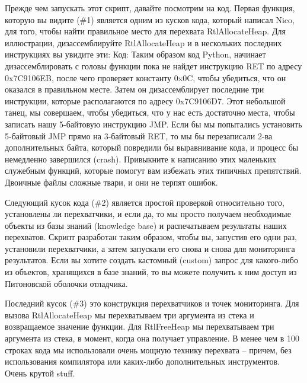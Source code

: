 \documentclass[12pt]{book}
\begin{document}



Прежде чем запускать этот скрипт, давайте посмотрим на код. Первая функция, которую вы видите (\#1) является одним из кусков кода, который написал Nico, для того, чтобы найти правильное место для перехвата RtlAllocateHeap. Для иллюстрации, дизассемблируйте RtlAllocateHeap и в нескольких последних инструкциях вы увидите эти:
Код:
Таким образом код Python, начинает дизассемблировать с головы функции пока не найдет инструкцию RET по адресу 0x7C9106EB, после чего проверяет константу 0x0C, чтобы убедиться, что он оказался в правильном месте. Затем он дизассемблирует последние три инструкции, которые располагаются по адресу 0x7C9106D7. Этот небольшой танец, мы совершаем, чтобы убедиться, что у нас есть достаточно места, чтобы записать нашу 5-байтовую инструкцию JMP. Если бы мы попытались установить 5-байтовый JMP прямо на 3-байтовый RET, то мы бы перезаписали 2-ва дополнительных байта, который повредили бы выравнивание кода, и процесс бы немедленно завершился (crash). Привыкните к написанию этих маленьких служебным функций, которые помогут вам избежать этих типичных препятствий. Двоичные файлы сложные твари, и они не терпят ошибок.

Следующий кусок кода (\#2) является простой проверкой относительно того, установлены ли перехватчики, и если да, то мы просто получаем необходимые объекты из базы знаний (knowledge base) и распечатываем результаты наших перехватов. Скрипт разработан таким образом, чтобы вы, запустив его одни раз, установили перехватчики, а затем запускали его снова и снова для мониторинга результатов. Если вы хотите создать кастомный (custom) запрос для какого-либо из объектов, хранящихся в базе знаний, то вы можете получить к ним доступ из Питоновской оболочки отладчика.

Последний кусок (\#3) это конструкция перехватчиков и точек мониторинга. Для вызова RtlAllocateHeap мы перехватываем три аргумента из стека и возвращаемое значение функции. Для RtlFreeHeap мы перехватываем три аргумента из стека, в момент, когда она получает управление. В менее чем в 100 строках кода мы использовали очень мощную технику перехвата – причем, без использования компилятора или каких-либо дополнительных инструментов. Очень крутой stuff.
\end{document}
